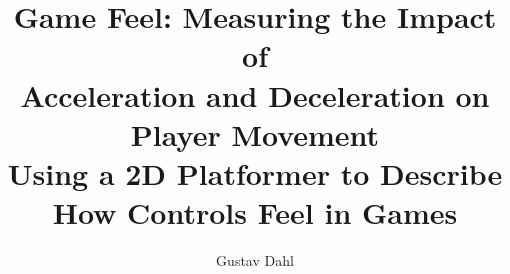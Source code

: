 \documentclass{acm_proc_article-sp}
\begin{document}

\title{%
  Game Feel: Measuring the Impact of\\Acceleration and Deceleration on Player Movement\\
  \large Using a 2D Platformer to Describe How Controls Feel in Games}



\author{
\alignauthor
Gustav Dahl\\
       \\
}

\maketitle











\begin{verbatim}

\end{verbatim}

\balancecolumns
\end{document}
